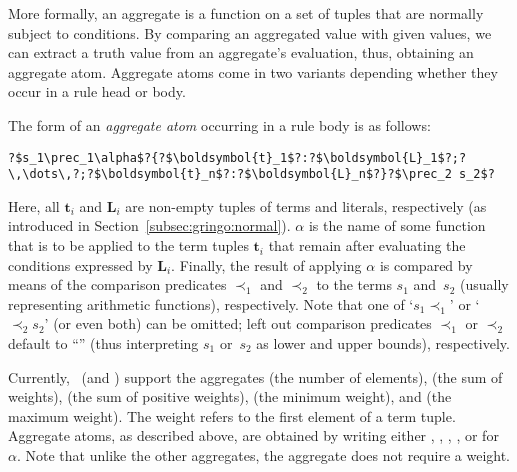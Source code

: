 More formally,
an aggregate is a function on a set of tuples that are normally subject to conditions. 
By comparing an aggregated value with given values, we can extract a truth value from an aggregate's evaluation,
thus, obtaining an aggregate atom.
Aggregate atoms come in two variants depending whether they occur in a rule head or body.

The form of an \emph{aggregate atom} occurring in a rule body is as follows:
%
\begin{lstlisting}[numbers=none,escapechar=?]
?$s_1\prec_1\alpha$?{?$\boldsymbol{t}_1$?:?$\boldsymbol{L}_1$?;?\,\dots\,?;?$\boldsymbol{t}_n$?:?$\boldsymbol{L}_n$?}?$\prec_2 s_2$?
\end{lstlisting}
%
Here, all $\boldsymbol{t}_i$ and $\boldsymbol{L}_i$ are non-empty tuples of terms and literals, respectively
(as introduced in Section~\ref{subsec:gringo:normal}). 
$\alpha$ is the name of some function that is to be applied to the term tuples $\boldsymbol{t}_i$
that remain after evaluating the conditions expressed by $\boldsymbol{L}_i$.
%
Finally, 
the result of applying $\alpha$ is compared by means of the comparison predicates $\prec_1$ and $\prec_2$ 
to the terms $s_1$ and~$s_2$ (usually representing arithmetic functions), respectively.
Note that one of `$s_1\prec_1$' or `$\prec_2 s_2$' (or even both) can be omitted;
left out comparison predicates $\prec_1$ or $\prec_2$ default to ``\code{<=}'' (thus interpreting $s_1$ or~$s_2$ as lower and upper bounds),
respectively.

Currently, \gringo\ (and \clingo) support the aggregates 
%
(the number of elements), 
%
(the sum of weights), 
%
(the sum of positive weights), 
%
(the minimum weight), and
%
(the maximum weight).
The weight refers to the first element of a term tuple.
Aggregate atoms, as described above, are obtained by writing
either , , , , or  for $\alpha$.
%
Note that unlike the other aggregates, the  aggregate does not require a weight.

